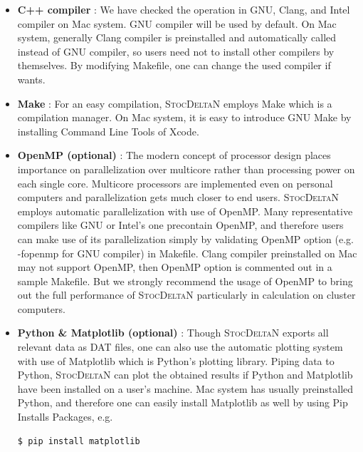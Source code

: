 \documentclass[aps, prd
, preprint
, nofootinbib 
, notitlepage
, superscriptaddress
, longbibliography
]{revtex4-1}
\begin{document}
\begin{itemize}
\item {\sffamily\bfseries C++ compiler} : We have checked the operation in GNU, Clang, and Intel compiler on Mac system. GNU compiler will be used by default.
On Mac system, generally Clang compiler is preinstalled and automatically called instead of GNU compiler, so users need not to install other compilers by themselves. 
By modifying Makefile, one can change the used compiler if wants.

\item {\sffamily\bfseries Make} : For an easy compilation, \textsc{StocDeltaN} employs Make which is a compilation manager. On Mac system, it is easy to introduce GNU Make
by installing Command Line Tools of Xcode.

\item {\sffamily\bfseries OpenMP (optional)} : The modern concept of processor design places importance on parallelization over multicore rather than processing power on each single core. 
Multicore processors are implemented even on personal computers and parallelization gets much closer to end users.
\textsc{StocDeltaN} employs automatic parallelization with use of OpenMP. Many representative compilers like GNU or Intel's one precontain OpenMP, and therefore
users can make use of its parallelization simply by validating OpenMP option (e.g. -fopenmp for GNU compiler) in Makefile.
Clang compiler preinstalled on Mac may not support OpenMP, then OpenMP option is commented out in a sample Makefile.
But we strongly recommend the usage of OpenMP to bring out the full performance of \textsc{StocDeltaN} particularly in calculation on cluster computers.

\item{\sffamily\bfseries Python \& Matplotlib (optional)} : Though \textsc{StocDeltaN} exports all relevant data as DAT files, one can also use the automatic plotting system
with use of Matplotlib which is Python's plotting library. Piping data to Python, \textsc{StocDeltaN} can plot the obtained results if Python and Matplotlib have been installed
on a user's machine. Mac system has usually preinstalled Python, and therefore one can easily install Matplotlib as well by using Pip Installs Packages, e.g.
\begin{lstlisting}[language = bash, numbers = none]
$ pip install matplotlib
\end{lstlisting}

\end{itemize}
\end{document}
